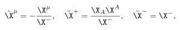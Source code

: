\begin{equation}
\tilde \X^\mu=-\frac{\X^\mu}{\X^-},\quad
\tilde\X^+=\frac{\X_A\X^A}{\X^-},\quad
\tilde\X^-=\X^-,
\label{cantr0}
\end{equation}

